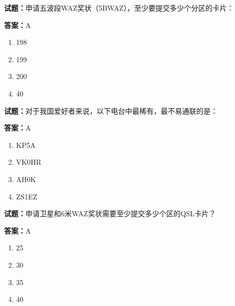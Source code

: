 \documentclass{ctexbook}
\begin{document}




\vspace{1em}

\textbf{试题：}申请五波段WAZ奖状（5BWAZ），至少要提交多少个分区的卡片： 

\textbf{答案：}A 

\begin{enumerate}[leftmargin=3em]
  \item 198 

  \item 199 

  \item 200 

  \item 40 

\end{enumerate}





\vspace{1em}

\textbf{试题：}对于我国爱好者来说，以下电台中最稀有，最不易通联的是： 

\textbf{答案：}A 

\begin{enumerate}[leftmargin=3em]
  \item KP5A 

  \item VK0HR 

  \item AH0K 

  \item ZS1EZ 

\end{enumerate}





\vspace{1em}

\textbf{试题：}申请卫星和6米WAZ奖状需要至少提交多少个区的QSL卡片？ 

\textbf{答案：}A 

\begin{enumerate}[leftmargin=3em]
  \item 25 

  \item 30 

  \item 35 

  \item 40 

\end{enumerate}
\end{document}
